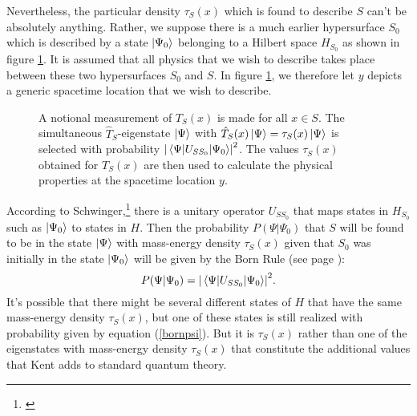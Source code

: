 Nevertheless, the particular density $\tau_S(x)$ which is found to describe $S$ can't be absolutely anything. Rather, we suppose there is a much earlier hypersurface $S_0$ which is described by a state $\ket{\Psi_0}$ belonging to a Hilbert space $H_{S_0}$ as shown in figure \ref{S1}.  It is assumed that all physics that we wish to describe takes place between these two hypersurfaces $S_0$ and $S$. In figure \ref{S1}, we therefore let $y$ depicts a generic spacetime location that we wish to describe. 
 \begin{figure}[ht!]
\captionsetup{justification=justified}
\centering



\vspace*{2px}
\caption{A notional measurement of $T_S(x)$ is made for all $x\in S$. The simultaneous  $\hat{T}_S$-eigenstate $\ket{\Psi}$ with $\hat{T}_S(x)\ket{\Psi}=\tau_S(x)\ket{\Psi}$ is selected with probability $\abs{\mel{\Psi}{U_{SS_0}}{\Psi_0}}^2$. The values $\tau_S(x)$ obtained for $T_S(x)$ are then used to calculate the physical properties at the spacetime location $y$.  }
\label{S1}
\end{figure} 
\vspace*{-12px}

 According to Schwinger,\footnote{\cite[p.1459]{SchwingerJulianI}} there is a unitary operator\label{SchwingerUnitaryOP}  $U_{SS_0}$ that maps states in $H_{S_0}$ such as $\ket{\Psi_0}$ to states in $H$. Then the probability $P(\Psi|\Psi_0)$ that  $S$ will be found to be in the state $\ket{\Psi}$ with mass-energy density $\tau_S(x)$ given that $S_0$ was initially in the state $\ket{\Psi_0}$ will be given by the Born Rule (see page \pageref{bornrule}):
 \begin{equation}\label{bornpsi}
 P(\Psi|\Psi_0) = \abs{\mel{\Psi}{U_{SS_0}}{\Psi_0}}^2.
 \end{equation}
It's possible that there might be several different states of $H$ that have the same mass-energy density $\tau_S(x)$, but one of these states is still realized with probability given by equation (\ref{bornpsi}). But it is $\tau_S(x)$ rather than one of the eigenstates with mass-energy density $\tau_S(x)$ that constitute the additional values that Kent adds to standard quantum theory. 

